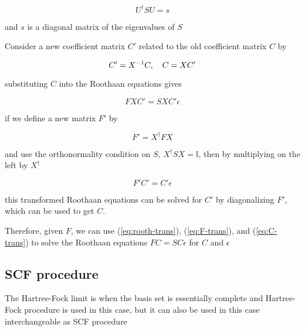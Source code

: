 \documentclass[11pt]{article}
\begin{document}
\[ U^{\dagger}SU=s \]

and \(s\) is a diagonal matrix of the eigenvalues of \(S\)

Consider a new coefficient matrix \(C'\) related to the old coefficient matrix \(C\) by

\begin{equation}
\label{eq:C-trans}
C' = X^{-1}C \qc C = X C'
\end{equation}

substituting \(C\) into the Roothaan equations gives

\[ F XC' = SXC' \epsilon \]

if we define a new matrix \(F'\) by

\begin{equation}
\label{eq:F-trans}
F' = X^{\dagger} FX
\end{equation}

and use the orthonormality condition on \(S\), \(X^{\dagger}SX=\mathbb{I}\), then by multiplying on the left by \(X^{\dagger}\)

\begin{equation}
\label{eq:rooth-trans}
F' C' = C' \epsilon
\end{equation}

this transformed Roothaan equations can be solved for \(C'\) by diagonalizing \(F'\), which can be used to get \(C\).

Therefore, given \(F\), we can use (\ref{eq:rooth-trans}), (\ref{eq:F-trans}), and (\ref{eq:C-trans}) to solve the Roothaan equations \(FC=SC\epsilon\) for \(C\) and \(\epsilon\)
\subsection{SCF procedure}
\label{sec:org5a6347b}

The Hartree-Fock limit is when the basis set is essentially complete and Hartree-Fock procedure is used in this case, but it can also be used in this case interchangeable as SCF procedure
\end{document}
